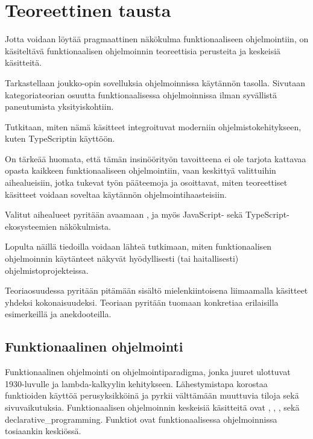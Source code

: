 \vspace{21.5pt}
\chapter{Teoreettinen tausta}

Jotta voidaan löytää pragmaattinen näkökulma funktionaaliseen ohjelmointiin, on käsiteltävä funktionaalisen ohjelmoinnin teoreettisia perusteita ja keskeisiä käsitteitä.

Tarkastellaan joukko-opin sovelluksia ohjelmoinnissa käytännön tasolla. Sivutaan kategoriateorian osuutta funktionaalisessa ohjelmoinnissa ilman syvällistä paneutumista yksityiskohtiin.

Tutkitaan, miten nämä käsitteet integroituvat moderniin ohjelmistokehitykseen, kuten TypeScriptin käyttöön.

On tärkeää huomata, että tämän insinöörityön tavoitteena ei ole tarjota kattavaa opasta kaikkeen funktionaaliseen ohjelmointiin, vaan keskittyä valittuihin aihealueisiin, jotka tukevat työn pääteemoja ja osoittavat, miten teoreettiset käsitteet voidaan soveltaa käytännön ohjelmointihaasteisiin.

Valitut aihealueet pyritään avaamaan , ja myös JavaScript- sekä TypeScript-ekosysteemien näkökulmista.

Lopulta näillä tiedoilla voidaan lähteä tutkimaan, miten funktionaalisen ohjelmoinnin käytänteet näkyvät hyödyllisesti (tai haitallisesti) ohjelmistoprojekteissa.

Teoriaosuudessa pyritään pitämään sisältö mielenkiintoisena liimaamalla käsitteet yhdeksi kokonaisuudeksi. Teoriaan pyritään tuomaan konkretiaa erilaisilla esimerkeillä ja anekdooteilla.

\section{Funktionaalinen ohjelmointi}

Funktionaalinen ohjelmointi on ohjelmointiparadigma, jonka juuret ulottuvat 1930-luvulle ja lambda-kalkyylin kehitykseen. Lähestymistapa korostaa funktioiden käyttöä perusyksikköinä ja pyrkii välttämään muuttuvia tiloja sekä sivuvaikutuksia. Funktionaalisen ohjelmoinnin keskeisiä käsitteitä ovat , , , sekä \gls{declarative_programming}. Funktiot ovat funktionaalisessa ohjelmoinnissa tosiaankin keskiössä. \citep{Tan2004,computerphile_lambda}

